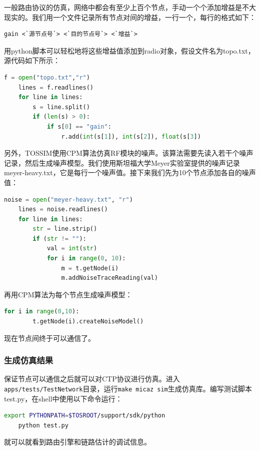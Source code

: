 一般路由协议的仿真，网络中都会有至少上百个节点，手动一个个添加增益是不大现实的。我们用一个文件记录所有节点对间的增益，一行一个，每行的格式如下：
\begin{lstlisting}[numbers=none]
    gain <`源节点号`> <`目的节点号`> <`增益`>
\end{lstlisting}
用python脚本可以轻松地将这些增益值添加到radio对象，假设文件名为topo.txt，源代码如下所示：
\begin{lstlisting}[language=python,frame=tb]
    f = open("topo.txt","r")
    lines = f.readlines()
    for line in lines:
        s = line.split()
        if (len(s) > 0):
            if s[0] == "gain":
                r.add(int(s[1]), int(s[2]), float(s[3])
\end{lstlisting}

另外，TOSSIM使用CPM算法仿真RF模块的噪声。该算法需要先读入若干个噪声记录，然后生成噪声模型。我们使用斯坦福大学Meyer实验室提供的噪声记录meyer-heavy.txt，它是每行一个噪声值。接下来我们先为10个节点添加各自的噪声值：
\begin{lstlisting}[language=python,frame=tb]
    noise = open("meyer-heavy.txt", "r")
    lines = noise.readlines()
    for line in lines:
        str = line.strip()
        if (str != ""):
            val = int(str)
            for i in range(0, 10):
                m = t.getNode(i)
                m.addNoiseTraceReading(val)
\end{lstlisting}

\noindent 再用CPM算法为每个节点生成噪声模型：
\begin{lstlisting}[language=python,frame=tb]
    for i in range(0,10):
        t.getNode(i).createNoiseModel()
\end{lstlisting}
现在节点间终于可以通信了。

\subsubsection{生成仿真结果}
保证节点可以通信之后就可以对CTP协议进行仿真。进入\texttt{apps/tests/TestNetwork}目录，运行\texttt{make micaz sim}生成仿真库。编写测试脚本test.py，在shell中使用以下命令运行：
\begin{lstlisting}[language=bash,numbers=none]
    export PYTHONPATH=$TOSROOT/support/sdk/python
    python test.py
\end{lstlisting}
就可以就看到路由引擎和链路估计的调试信息。

